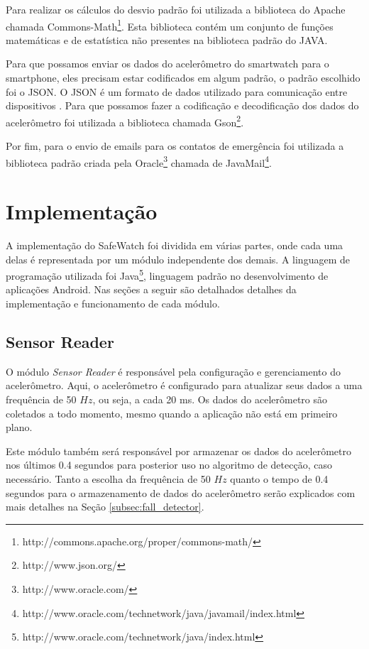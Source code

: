 Para realizar os cálculos do desvio padrão foi utilizada a biblioteca do Apache chamada Commons-Math\footnote{http://commons.apache.org/proper/commons-math/}. Esta biblioteca contém um conjunto de funções matemáticas e de estatística não presentes na biblioteca padrão do JAVA. 

Para que possamos enviar os dados do acelerômetro do smartwatch para o smartphone, eles precisam estar codificados em algum padrão, o padrão escolhido foi o JSON. O JSON é um formato de dados utilizado para comunicação entre dispositivos \citep{JSON16}. Para que possamos fazer a codificação e decodificação dos dados do acelerômetro foi utilizada a biblioteca chamada Gson\footnote{http://www.json.org/}.

Por fim, para o envio de emails para os contatos de emergência foi utilizada a biblioteca padrão criada pela Oracle\footnote{http://www.oracle.com/} chamada de JavaMail\footnote{http://www.oracle.com/technetwork/java/javamail/index.html}. 





\section{Implementação}
\label{sec:implementation}
A implementação do SafeWatch foi dividida em várias partes, onde cada uma delas é representada por um módulo independente dos demais. A linguagem de programação utilizada foi Java\footnote{http://www.oracle.com/technetwork/java/index.html}, linguagem padrão no desenvolvimento de aplicações Android. Nas seções a seguir são detalhados detalhes da implementação e funcionamento de cada módulo.


\subsection{Sensor Reader}
O módulo \textit{Sensor Reader} é responsável pela configuração e gerenciamento do acelerômetro. Aqui, o acelerômetro é configurado para atualizar seus dados a uma frequência de 50 $Hz$, ou seja, a cada 20 ms. Os dados do acelerômetro são coletados a todo momento, mesmo quando a aplicação não está em primeiro plano.

Este módulo também será responsável por armazenar os dados do acelerômetro nos últimos 0.4 segundos para posterior uso no algoritmo de detecção, caso necessário. Tanto a escolha da frequência de 50 $Hz$ quanto o tempo de 0.4 segundos para o armazenamento de dados do acelerômetro serão explicados com mais detalhes na Seção \ref{subsec:fall_detector}.



